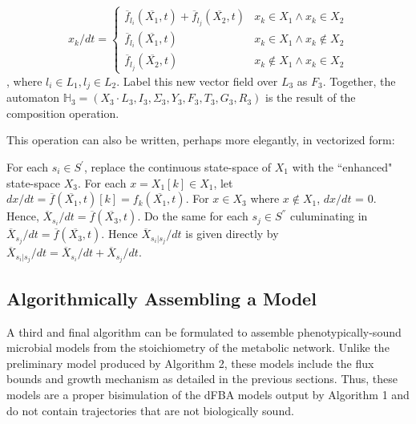 \[x_k / dt = \begin{cases}
      \overline{f}_{l_i}(\overline{X_1}, t) + \overline{f}_{l_j}(\overline{X_2}, t) & x_k \in X_1 \land x_k \in X_2 \\
      \overline{f}_{l_i}(\overline{X_1}, t) & x_k \in X_1 \land x_k \notin X_2 \\
      \overline{f}_{l_j}(\overline{X_2}, t) & x_k \notin X_1 \land x_k \in X_2
   \end{cases}
\],
where $l_i \in L_1, l_j \in L_2$. Label this new vector field over $L_3$ as $F_3$. Together, the automaton $\mathbb{H}_3 = (X_3 \cdot L_3, I_3, \Sigma_3, Y_3, F_3, T_3, G_3, R_3)$ is the result of the composition operation.

This operation can also be written, perhaps more elegantly, in vectorized form:

For each $s_i \in S^{'}$, replace the continuous state-space of $X_1$ with the ``enhanced" state-space $X_3$. For each $x = X_1[k] \in X_1$, let $dx / dt = \overline{f}(\overline{X_1}, t)[k] = f_k(\overline{X_1}, t)$. For $x \in X_3$ where $x \notin X_1$, $dx / dt$ = 0. Hence, $\overline{X}_{s_i} /dt = \overline{f}(\overline{X_3}, t)$. Do the same for each $s_j \in S^{''}$ culuminating in $\overline{X}_{s_j} /dt = \overline{f}(\overline{X_3}, t)$. Hence $\overline{X}_{s_i| s_j} /dt$ is given directly by $\overline{X}_{s_i| s_j} /dt = \overline{X}_{s_i} /dt + \overline{X}_{s_j} /dt$.

\subsection{Algorithmically Assembling a Model}

A third and final algorithm can be formulated to assemble phenotypically-sound microbial models from the stoichiometry of the metabolic network. Unlike the preliminary model produced by Algorithm 2, these models include the flux bounds and growth mechanism as detailed in the previous sections. Thus, these models are a proper bisimulation of the dFBA models output by Algorithm 1 and do not contain trajectories that are not biologically sound.\\


